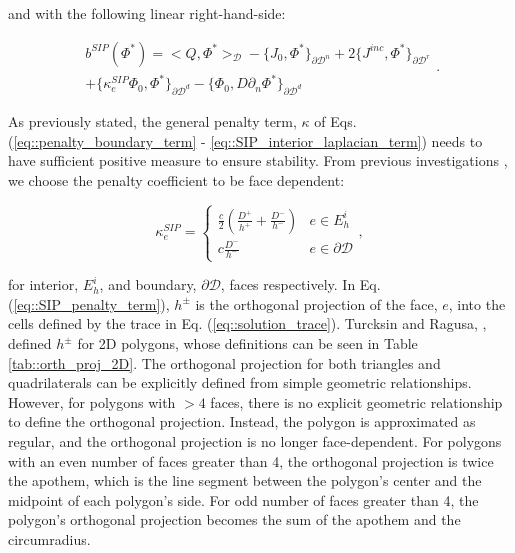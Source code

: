 \noindent and with the following linear right-hand-side:

\begin{equation}
\label{eq::SIP_linear_form}
\begin{aligned}
b^{SIP} (\Phi^*) = \Big<  Q, \Phi^*  \Big>_{\mathcal{D}}  - \Big\{   J_{0}, \Phi^*  \Big\}_{\partial \mathcal{D}^n} +  2 \Big\{   J^{inc}, \Phi^*  \Big\}_{\partial 				\mathcal{D}^r} \\ + \Big\{ \kappa_e^{SIP}   \Phi_0 ,   \Phi^* \Big\}_{\partial \mathcal{D}^d} - \Big\{   \Phi_0  ,  D \partial_n \Phi^* \Big\}_{\partial 					\mathcal{D}^d} 
\end{aligned} .
\end{equation}

\noindent As previously stated, the general penalty term, $\kappa$ of Eqs. (\ref{eq::penalty_boundary_term} - \ref{eq::SIP_interior_laplacian_term}) needs to have sufficient positive measure to ensure stability. From previous investigations \cite{ref::DSA_2D_arb_poly,wang2009adaptive,ref::DSA_wang_ragusa}, we choose the penalty coefficient to be face dependent:

\begin{equation}
\kappa_e^{SIP} = 
\begin{cases}
	\frac{c}{2} \left(  \frac{D^+}{h^+} + \frac{D^-}{h^-} \right) & e \in E_h^i\\ 
	c \frac{D^-}{h^-}& e \in \partial \mathcal{D}
\end{cases},
\label{eq::SIP_penalty_term}
\end{equation}

\noindent for interior, $E_h^i$, and boundary, $\partial \mathcal{D}$, faces respectively. In Eq. (\ref{eq::SIP_penalty_term}), $h^\pm$ is the orthogonal projection of the face, $e$, into the cells defined by the trace in Eq. (\ref{eq::solution_trace}). Turcksin and Ragusa, \cite{turcksin2014discontinuous}, defined $h^\pm$ for 2D polygons, whose definitions can be seen in Table \ref{tab::orth_proj_2D}. The orthogonal projection for both triangles and quadrilaterals can be explicitly defined from simple geometric relationships. However, for polygons with $>4$ faces, there is no explicit geometric relationship to define the orthogonal projection. Instead, the polygon is approximated as regular, and the orthogonal projection is no longer face-dependent. For polygons with an even number of faces greater than 4, the orthogonal projection is twice the apothem, which is the line segment between the polygon's center and the midpoint of each polygon's side. For odd number of faces greater than 4, the polygon's orthogonal projection becomes the sum of the apothem and the circumradius.

